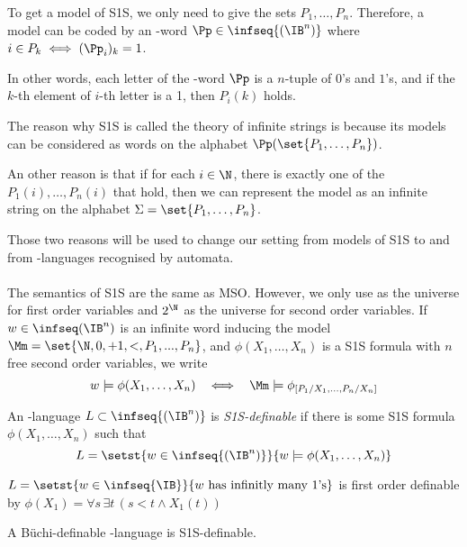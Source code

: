 \begin{remark}
To get a model of S1S, we only need to give the sets $P_1, \dots, P_n$.
Therefore, a model can be coded by an \w-word $\Pp \in \infseq{(\IB^n)}$
where $i \in P_k \iff (\Pp_i)_k = 1$.

In other words, each letter of the \w-word $\Pp$ is a $n$-tuple of
$0$'s and $1$'s, and if the $k$-th element of $i$-th letter is a 1,
then $P_i(k)$ holds.
\end{remark}

The reason why S1S is called the theory of infinite strings
is because its models can be considered as words on the
alphabet $\Pp(\set{P_1, \dots, P_n})$.

An other reason is that
if for each $i \in \N$, there is exactly
one of the $P_1(i), \dots, P_n(i)$ that hold, then
we can represent the model as an infinite string
on the alphabet $\Sigma = \set{P_1, \dots, P_n}$.

Those two reasons will be used to change our setting from
models of S1S to and from \w-languages recognised by automata.

\paragraph{}
The semantics of S1S are the same as MSO. However,
we only use \N as the universe for first order variables
and $2^\N$ as the universe for second order variables.
If $w \in \infiniteWords$ is an infinite word inducing
the model $\Mm = \set{\N, 0, +1, <, P_1, ..., P_n}$,
and $\phi(X_1, \dots, X_n)$
is a S1S formula with $n$ free second order variables,
we write \[
    w \models \phi(X_1, \dots, X_n)
    ~~\iff~~
    \Mm \models \phi_{[P_1/X_1, \dots, P_n/X_n]}
\]

\begin{definition}
    An \w-language $L \subset \infseq{(\IB^n)}$ is
    \emph{S1S-definable} if there is some S1S formula
    $\phi(X_1, \dots, X_n)$ such that
\[
    L = \setst{w \in \infseq{(\IB^n)}}{
        w \models \phi(X_1, \dots, X_n)
    }
\]
\end{definition}

\begin{example}
    $L = \setst{w \in \infseq{\IB}}{w \text{ has infinitly many 1's}}$
    is first order definable by
    $\phi(X_1) = \forall s\, \exists t\, (s < t \wedge X_1(t))$
\end{example}



\begin{lemma}\label{lemma:buchi-definable}
    A Büchi-definable \w-language is S1S-definable.
\end{lemma}

